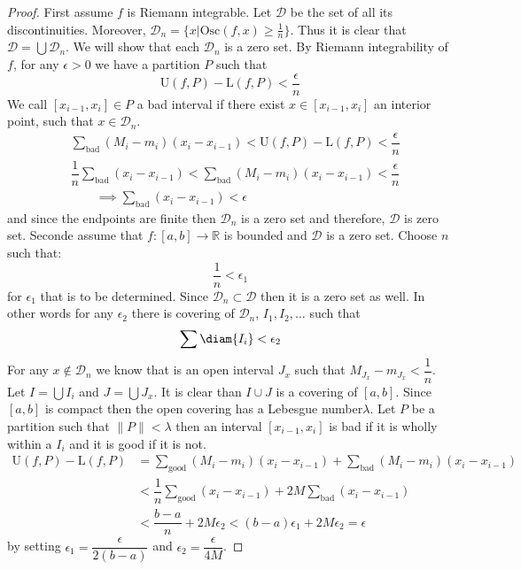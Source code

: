 \begin{proof}
    First assume \(f\) is Riemann integrable. Let \(\mathcal{D}\) be the set of all its discontinuities. Moreover, \(\mathcal{D}_n = \{x | \text{Osc}(f,x) \geq \frac{1}{n}\}\). Thus it is clear that \(\mathcal{D} = \bigcup \mathcal{D}_n \). We will show that each \(\mathcal{D}_n\) is a zero set. By Riemann integrability of \(f\), for any \(\epsilon >0\) we have a partition \(P\) such that
    \begin{equation*}
        \text{U}(f,P) - \text{L}(f,P) < \dfrac{\epsilon}{n}
    \end{equation*}
    We call \([x_{i-1},x_i] \in P\) a bad interval if there exist \(x \in [x_{i-1},x_i]\) an interior point, such that \(x \in \mathcal{D}_n\).
    \begin{align*}
         & \sum_{\text{bad}}{(M_i - m_i)(x_i - x_{i-1})} < 	\text{U}(f,P) - \text{L}(f,P) < \dfrac{\epsilon}{n}                      \\
         & \dfrac{1}{n} \sum_{\text{bad}}{(x_i - x_{i-1}) } < \sum_{\text{bad}}{(M_i - m_i)( x_i - x_{i-1}) } < \dfrac{\epsilon}{n} \\
         & \qquad \implies \sum_{\text{bad}}{(x_i - x_{i-1}) } < \epsilon
    \end{align*}
    and since the endpoints are finite then \(\mathcal{D}_n\) is a zero set and therefore, \(\mathcal{D}\) is zero set.
    Seconde assume that \(f:[a,b] \to \mathbb{R}\) is bounded and \(\mathcal{D}\) is a zero set. Choose \(n\) such that:
    \begin{equation*}
        \dfrac{1}{n} < \epsilon_1
    \end{equation*}
    for \(\epsilon_1\) that is to be determined. Since \(\mathcal{D}_n \subset \mathcal{D} \) then it is a zero set as well. In other words for any \(\epsilon_2\) there is covering of \(\mathcal{D}_n\), \(I_1, I_2, \dots\) such that
    \begin{equation*}
        \sum{\diam{I_i}} < \epsilon_2
    \end{equation*}
    For any \(x \notin \mathcal{D}_n\) we know that is an open interval \(J_x\) such that \(M_{J_x} - m_{J_x} < \dfrac{1}{n}\). Let \(I = \bigcup I_i\) and  \(J = \bigcup J_x\).
    It is clear than \(I \cup J\) is a covering of \([a,b]\). Since \([a,b]\) is compact then the open covering has a Lebesgue number\(\lambda\). Let \(P\) be a partition such that \(\|P\| < \lambda\) then an interval \([x_{i-1}, x_i]\) is bad if it is wholly within a \(I_i\) and it is good if it is not.
    \begin{align*}
        \text{U}(f,P) - \text{L}(f,P) & = \sum_{\text{good}}{(M_i - m_i)(x_i - x_{i-1})}+ \sum_{\text{bad}}{(M_i - m_i)(x_i - x_{i-1})} \\
                                      & < \dfrac{1}{n} \sum_{\text{good}}{(x_i - x_{i-1})} + 2M \sum_{\text{bad}}{(x_i - x_{i-1})}      \\
                                      & < \dfrac{b-a}{n} + 2M\epsilon_2 < (b-a)\epsilon_1 +  2M\epsilon_2 = \epsilon
    \end{align*}
    by setting \(\epsilon_1 = \dfrac{\epsilon}{2(b-a)}\) and \(\epsilon_2 = \dfrac{\epsilon}{4M}\).
\end{proof}

